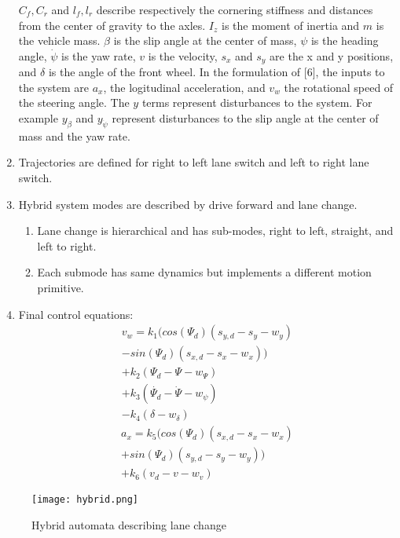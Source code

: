 \begin{enumerate}
	\(C_f,C_r\) and \(l_f, l_r\) describe respectively the cornering stiffness and distances from the center of gravity to the axles. \(I_z\) is the moment of inertia and \(m\) is the vehicle mass. \(\beta\) is the slip angle at the center of mass, \(\psi\) is the heading angle, \(\dot{\psi}\) is the yaw rate, \(v\) is the velocity, \(s_x\) and \(s_y\) are the x and y positions, and \(\delta\) is the angle of the front wheel. In the formulation of [6], the inputs to the system are \(a_x\), the logitudinal acceleration, and \(v_w\) the rotational speed of the steering angle. The \(y\) terms represent disturbances to the system. For example \(y_{\beta}\) and \(y_{\dot{\psi}}\) represent disturbances to the slip angle at the center of mass and the yaw rate. 
	\item Trajectories are defined for right to left lane switch and left to right lane switch.
	\item Hybrid system modes are described by drive forward and lane change.
	\begin{enumerate}
		\item Lane change is hierarchical and has sub-modes, right to left, straight, and left to right.
		\item Each submode has same dynamics but implements a different motion primitive.
	\end{enumerate}
	\item Final control equations:
	\begin{equation}
	\begin{aligned}
	v_w=k_1(cos{(\Psi_d)}(s_{y,d}-s_y-w_y)\\
	-sin{(\Psi_d)}(s_{x,d}-s_x-w_x))\\ 
	+k_2(\Psi_d-\Psi-w_{\Psi}) \\
	+k_3(\dot{\Psi_d} -\dot{\Psi}-w_{\psi})\\
	-k_4(\delta-w_{\delta})
	\end{aligned}
	\end{equation}
	\begin{equation}
	\begin{aligned}
	a_x=k_5(cos{(\Psi_d)}(s_{x,d}-s_x-w_x)\\
	+sin{(\Psi_d)}(s_{y,d}-s_y-w_y))\\
	+k_6(v_d-v-w_v)
	\end{aligned}
	\end{equation}
\end{enumerate}
\begin{figure}[tb]
	\label{fig:discreteview}
	\centering
	\texttt{[image: hybrid.png]}
	\caption{Hybrid automata describing lane change}
\end{figure}
